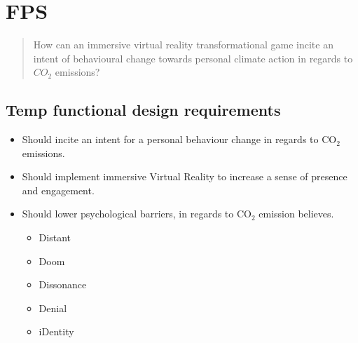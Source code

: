 \chapter{FPS}
\begin{quote}
    How can an immersive virtual reality transformational game incite an intent of behavioural change towards personal climate action in regards to $CO_{2}$ emissions? 
\end{quote}

\section{Temp functional design requirements}
\begin{itemize}
    \item Should incite an intent for a personal behaviour change in regards to CO$_2$ emissions.
    \item Should implement immersive Virtual Reality to increase a sense of presence and engagement.
    \item Should lower psychological barriers, in regards to CO$_2$ emission believes.\cite{the5Ds}
    \begin{itemize}
        \item Distant
        \item Doom
        \item Dissonance
        \item Denial
        \item iDentity
    \end{itemize}
\end{itemize}


